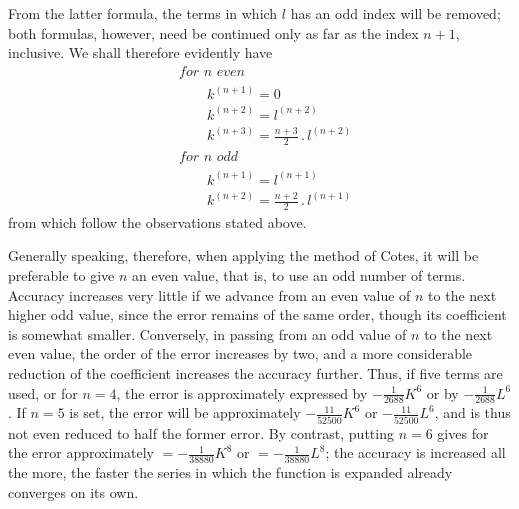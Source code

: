 From the latter formula, the terms in which $l$ has an odd index will be removed; both formulas, however, need be continued only as far as the index $n+1$, inclusive. We shall therefore evidently have
\[
\begin{aligned}
&\textit{for $n$ even}\\
&\qquad k^{(n+1)}=0\\
&\qquad k^{(n+2)}=l^{(n+2)}\\
&\qquad k^{(n+3)}=\frac{n+3}{2}\mathbin{.}l^{(n+2)}\\
&\textit{for $n$ odd}\\
&\qquad k^{(n+1)}=l^{(n+1)}\\
&\qquad k^{(n+2)}=\frac{n+2}{2}\mathbin{.}l^{(n+1)}
\end{aligned}
\]
from which follow the observations stated above.

Generally speaking, therefore, when applying the method of Cotes, it will be preferable to give $n$ an even value, that is, to use an odd number of terms. Accuracy increases very little if we advance from an even value of $n$ to the next higher odd value, since the error remains of the same order, though its coefficient is somewhat smaller. Conversely, in passing from an odd value of $n$ to the next even value, the order of the error increases by two, and a more considerable reduction of the coefficient increases the accuracy further. Thus, if five terms are used, or for $n=4$, the error is approximately expressed by $-\frac{1}{2688}K^6$ or by $-\frac{1}{2688}L^6$. If $n=5$ is set, the error will be approximately $-\frac{11}{52500}K^6$ or $-\frac{11}{52500}L^6$, and is thus not even reduced to half the former error. By contrast, putting $n=6$ gives for the error approximately $=-\frac{1}{38880}K^8$ or $=-\frac{1}{38880}L^8$; the accuracy is increased all the more, the faster the series in which the function is expanded already converges on its own.


